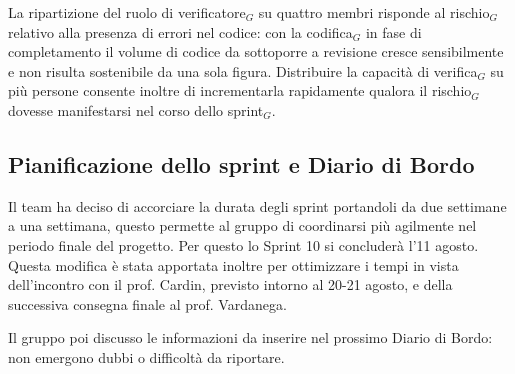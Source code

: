 \documentclass[a4paper, 10pt, colorlinks=true, linkcolor=black, urlcolor=blue, citecolor=blue, hidelinks]{article}
\begin{document}
La ripartizione del ruolo di verificatore$_G$ su quattro membri risponde al rischio$_G$ relativo alla presenza di errori nel codice: con la codifica$_G$ in fase di completamento il volume di codice da sottoporre a revisione cresce sensibilmente e non risulta sostenibile da una sola figura. Distribuire la capacità di verifica$_G$ su più persone consente inoltre di incrementarla rapidamente qualora il rischio$_G$ dovesse manifestarsi nel corso dello sprint$_G$.

\subsection{Pianificazione dello sprint e Diario di Bordo}
Il team ha deciso di accorciare la durata degli sprint portandoli da due settimane a una settimana, questo permette al gruppo di coordinarsi più agilmente nel periodo finale del progetto. Per questo lo Sprint 10 si concluderà l'11 agosto. Questa modifica è stata apportata inoltre per ottimizzare i tempi in vista dell'incontro con il prof. Cardin, previsto intorno al 20-21 agosto, e della successiva consegna finale al prof. Vardanega.

Il gruppo poi discusso le informazioni da inserire nel prossimo Diario di Bordo: non emergono dubbi o difficoltà da riportare.
\end{document}
